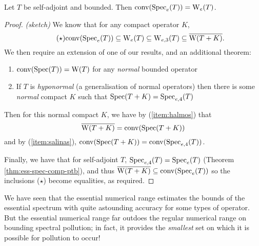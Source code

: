\documentclass[../main.tex]{subfiles}
\begin{document}
\begin{corollary}
  Let $T$ be self-adjoint and bounded. Then $\mathrm{conv}(\mathrm{Spec}_e(T)) = \mathrm{W}_e(T)$.
\end{corollary}
\begin{proof}\emph{(sketch)}
We know that for any compact operator $K$,
  \begin{equation*}
  \tag{$\star$}
  \label{eqn:inclusions}
  \mathrm{conv}(\mathrm{Spec}_e(T)) \subseteq \mathrm{W}_e(T) \subseteq \mathrm{W}_{e,3}(T) \subseteq \overline{\mathrm{W}(T+K)}.
  \end{equation*}
We then require an extension of one of our results, and an additional theorem:
  \begin{enumerate}
    \item\label{item:halmos} $\mathrm{conv}(\mathrm{Spec}(T)) = \mathrm{W}(T)$ for any \emph{normal} bounded operator \cite{halmos1982hilbert}
    \item\label{item:salinas} If $T$ is \emph{hyponormal} (a generalisation of normal operators) then there is some 
      \emph{normal} compact $K$ such that $\mathrm{Spec}(T+K) = \mathrm{Spec}_{e,4}(T)$ \cite{salinas1972operators}
  \end{enumerate}

Then for this normal compact $K$, we have by (\ref{item:halmos}) that
  $$\overline{\mathrm{W}(T+K)} = \mathrm{conv}(\mathrm{Spec}(T+K))$$
  and by (\ref{item:salinas}), $\mathrm{conv}(\mathrm{Spec}(T+K)) = \mathrm{conv}(\mathrm{Spec}_{e,4}(T))$.

  Finally, we have that for self-adjoint $T$, $\mathrm{Spec}_{e,4}(T) = \mathrm{Spec}_e(T)$
  (Theorem \ref{thm:ess-spec-comp-ptb}), and %
  thus $\overline{\mathrm{W}(T+K)} \subseteq \mathrm{conv}(\mathrm{Spec}_e(T))$
  so the inclusions ($\star$) become equalities, as required.
\end{proof}

We have seen that the essential numerical range estimates the bounds of the
essential spectrum with quite astounding accuracy for some types of operator.
But the essential numerical range far outdoes the regular numerical range on
bounding spectral pollution; in fact, it provides the \emph{smallest} set on which
it is possible for pollution to occur! 
\end{document}
